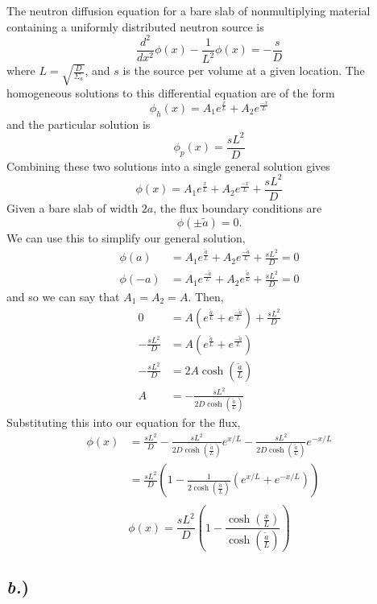 \documentclass{article}
\newcommand{\Xs}{\Sigma}
\begin{document}
The neutron diffusion equation for a bare slab of nonmultiplying material containing a uniformly distributed neutron source is 
$$ \frac{d^2}{dx^2}\phi(x) - \frac{1}{L^2}\phi(x) = -\frac{s}{D} $$
where $L = \sqrt{\frac{D}{\Xs_a}}$, and $s$ is the source per volume at a given location. The homogeneous solutions to this differential equation are of the form
$$ \phi_h(x) = A_1 e^{\frac{x}{L}} + A_2 e^{\frac{-x}{L}} $$
and the particular solution is
$$ \phi_p(x) = \frac{sL^2}{D} $$
Combining these two solutions into a single general solution gives
$$ \phi(x) = A_1 e^{\frac{x}{L}} + A_2 e^{\frac{-x}{L}} + \frac{sL^2}{D} $$
Given a bare slab of width $2a$, the flux boundary conditions are 
$$ \phi(\pm \tilde{a}) = 0 .$$
We can use this to simplify our general solution,
\begin{align*}
\phi(a)	&= A_1 e^{\frac{\tilde{a}}{L}} + A_2 e^{\frac{-\tilde{a}}{L}} + \frac{sL^2}{D} = 0 \\
\phi(-a)&= A_1 e^{\frac{-\tilde{a}}{L}} + A_2 e^{\frac{\tilde{a}}{L}} + \frac{sL^2}{D} = 0 
\end{align*}
and so we can say that $A_1 = A_2 = A$. Then,
\begin{align*}
0 &= A \left(e^{\frac{\tilde{a}}{L}} + e^{\frac{-\tilde{a}}{L}}\right) + \frac{sL^2}{D} \\
-\frac{sL^2}{D} &= A \left(e^{\frac{\tilde{a}}{L}} + e^{\frac{-\tilde{a}}{L}}\right) \\
-\frac{sL^2}{D} &= 2A \cosh\left(\frac{\tilde{a}}{L}\right) \\
A &= -\frac{sL^2}{2D\cosh\left(\frac{\tilde{a}}{L}\right)} 
\end{align*}
Substituting this into our equation for the flux,
\begin{align*}
\phi(x)	&= \frac{sL^2}{D} - \frac{sL^2}{2D\cosh\left(\frac{\tilde{a}}{L}\right)}e^{x/L} - \frac{sL^2}{2D\cosh\left(\frac{\tilde{a}}{L}\right)}e^{-x/L} \\
		&= \frac{sL^2}{D}\left(1-\frac{1}{2\cosh\left(\frac{\tilde{a}}{L}\right)} \left(e^{x/L} + e^{-x/L}\right)\right) \\
\end{align*}
$$\boxed{ \phi(x) = \frac{sL^2}{D}\left(1-\frac{\cosh\left(\frac{x}{L}\right)}{\cosh\left(\frac{\tilde{a}}{L}\right)}\right) }$$

\subsection*{\textit{b.})}
\end{document}
